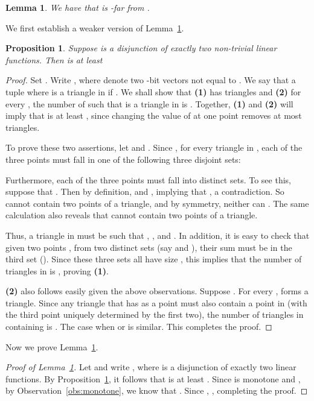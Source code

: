 \documentclass[11pt,english]{article}
\newtheorem{lemma}[lem]{Lemma}
\newtheorem{prop}{Proposition}
\theoremstyle{definition}
\theoremstyle{remark}
\begin{document}
\begin{lemma}\label{lemma:distance} 
We have that
 is -far from . 
\end{lemma} 
We first establish a weaker version of Lemma~\ref{lemma:distance}.
\begin{prop}\label{prop:distance-2-disj}
Suppose  is a disjunction of exactly two non-trivial linear functions. 
Then  is at least  
\end{prop}
\begin{proof} 
Set . Write , where 
 denote two -bit vectors not equal to .
We say that a tuple  where  is a triangle in  if .
We shall show that
{\bf (1)}  has  triangles and 
{\bf (2)} for every , the number of  such that  is a triangle in  is .
Together, {\bf (1)} and {\bf (2)} will imply that  is at least , 
since changing the value of  at one point removes at most  triangles. 

To prove these two assertions, let  
and .
Since , for every triangle  in , 
each of the three points  must fall in one of the following three disjoint sets:


Furthermore, each of the three points must fall into distinct sets. 
To see this, suppose that . 
Then by definition,  and , 
implying that , a contradiction. 
So  cannot contain two points of a triangle, and by symmetry, neither can .
The same calculation also reveals that  cannot contain two points of a triangle.

Thus, a triangle  in  must be such that 
, , and .
In addition, it is easy to check that 
given two points ,  from two distinct sets (say  and ), 
their sum  must be in the third set (). 
Since these three sets  all have size , 
this implies that 
the number of triangles in  is , proving {\bf (1)}.

{\bf (2)} also follows easily given the above observations. 
Suppose . For every ,  forms a triangle.
Since any triangle that has  as a point 
must also contain a point in 
 (with the third point uniquely determined by the first two), 
the number of triangles in  containing  is . 
The case when  or  is similar. This completes the proof. 
\end{proof}
Now we prove Lemma~\ref{lemma:distance}. 
\begin{proof}[Proof of Lemma~\ref{lemma:distance}]
Let  and write , 
where  is a disjunction of exactly two linear functions.  
By Proposition~\ref{prop:distance-2-disj}, it follows that  is at least . 
Since  is monotone and , 
by Observation~\ref{obs:monotone}, we know 
that . 
Since , , completing the proof. 
\end{proof}
\end{document}
